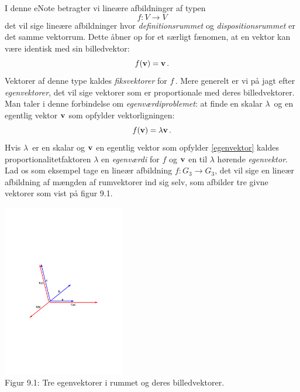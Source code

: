I denne eNote betragter vi lineære afbildninger af typen 
\begin{equation}\label{fiksektor}
f:V\rightarrow V
\end{equation}
 det vil sige lineære afbildninger hvor \textit{definitionsrummet} og \textit{dispositionsrummet} er det samme vektorrum. Dette åbner op for et særligt fænomen, at en vektor kan være identisk med sin billedvektor:
\begin{equation}\label{fiksektor}
f(\mathbf{v})=\mathbf{v}\,.
\end{equation}
Vektorer af denne type kaldes \textit{fiksvektorer} for $f\,$. Mere generelt er vi på jagt efter \textit{egenvektorer}, det vil sige vektorer som er proportionale med deres billedvektorer. Man taler i denne forbindelse om \textit{egenværdiproblemet}: at finde en skalar $\lambda\,$ og en egentlig vektor $\mathbf{v}$ som opfylder vektorligningen: 
\begin{equation}\label{egenvektor}
f(\mathbf{v})=\lambda\mathbf{v}\,.
\end{equation}
Hvis $\lambda\,$ er en skalar og $\mathbf{v}$ en egentlig vektor som opfylder \ref{egenvektor} kaldes proportionalitetfaktoren $\lambda$ en \textit{egenværdi} for $f$ og $\mathbf{v}$ en til $\lambda$ hørende \textit{egenvektor}. Lad os som eksempel tage en lineær afbildning 
$ f:G_3 \rightarrow G_3 $, det vil sige en lineær afbildning af mængden af rumvektorer ind sig selv, som afbilder tre givne vektorer som vist på figur 9.1.
\begin{center}
\includegraphics[trim=4.5cm 9.5cm 4.5cm 10cm,width=0.40\textwidth,clip]{evektorRummet.pdf} \\
Figur 9.1: Tre egenvektorer i rummet og deres billedvektorer. 	
\end{center}

